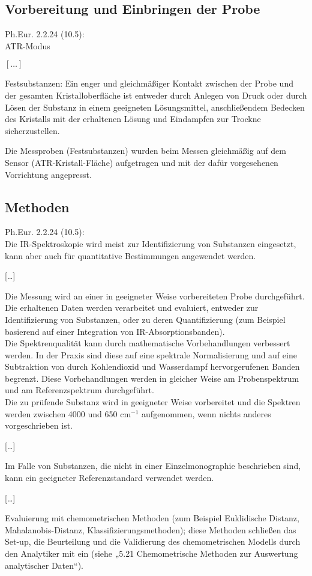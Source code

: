 \documentclass[11pt, a4paper]{article}
\newcommand\VersionPhEur{10.5}
\begin{document}
\subsection{Vorbereitung und Einbringen der Probe}
\begin{framed}
Ph.Eur. 2.2.24 (\VersionPhEur): \\

ATR-Modus 

$[\dots]$

Festsubstanzen: Ein enger und gleichmäßiger Kontakt zwischen der Probe und der gesamten Kristalloberfläche ist entweder durch Anlegen von Druck oder durch Lösen der Substanz in einem geeigneten Lösungsmittel, anschließendem Bedecken des Kristalls mit der erhaltenen Lösung und Eindampfen zur Trockne sicherzustellen.
\end{framed}
Die Messproben (Festsubstanzen) wurden beim Messen gleichmäßig auf dem Sensor (ATR-Kristall-Fläche) aufgetragen und mit der dafür vorgesehenen Vorrichtung angepresst.

\subsection{Methoden}
\begin{framed}
Ph.Eur. 2.2.24 (\VersionPhEur): \\

Die IR-Spektroskopie wird meist zur Identifizierung von Substanzen eingesetzt, kann aber auch für quantitative Bestimmungen angewendet werden. 

[…]

Die Messung wird an einer in geeigneter Weise vorbereiteten Probe durchgeführt. Die erhaltenen Daten werden verarbeitet und evaluiert, entweder zur Identifizierung von Substanzen, oder zu deren Quantifizierung (zum Beispiel basierend auf einer Integration von IR-Absorptionsbanden). \\

Die Spektrenqualität kann durch mathematische Vorbehandlungen verbessert werden. In der Praxis sind diese auf eine spektrale Normalisierung und auf eine Subtraktion von durch Kohlendioxid und Wasserdampf hervorgerufenen Banden begrenzt. Diese Vorbehandlungen werden in gleicher Weise am Probenspektrum und am Referenzspektrum durchgeführt. \\

Die zu prüfende Substanz wird in geeigneter Weise vorbereitet und die Spektren werden zwischen 4000 und 650 cm$^{-1}$ aufgenommen, wenn nichts anderes vorgeschrieben ist. 

[…]

Im Falle von Substanzen, die nicht in einer Einzelmonographie beschrieben sind, kann ein geeigneter Referenzstandard verwendet werden. 

[…]

Evaluierung mit chemometrischen Methoden (zum Beispiel Euklidische Distanz, Mahalanobis-Distanz, Klassifizierungsmethoden); diese Methoden schließen das Set-up, die Beurteilung und die Validierung des chemometrischen Modells durch den Analytiker mit ein (siehe „5.21 Chemometrische Methoden zur Auswertung analytischer Daten“).
\end{framed}
\end{document}
